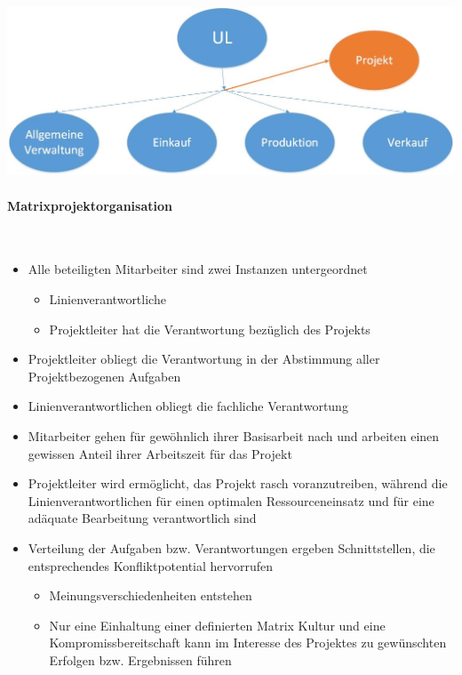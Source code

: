\includegraphics[scale=0.3]{1jahr_pictures/lf02-pic/lf02-projektkoordination.jpg}

\paragraph{Matrixprojektorganisation}~\\
\begin{itemize}
	\item Alle beteiligten Mitarbeiter sind zwei Instanzen untergeordnet
	\begin{itemize}
		\item Linienverantwortliche
		\item Projektleiter hat die Verantwortung bezüglich des Projekts
	\end{itemize}
	\item Projektleiter obliegt die Verantwortung in der Abstimmung aller Projektbezogenen Aufgaben
	\item Linienverantwortlichen obliegt die fachliche Verantwortung
	\item Mitarbeiter gehen für gewöhnlich ihrer Basisarbeit nach und arbeiten einen gewissen Anteil ihrer Arbeitszeit für das Projekt
	\item Projektleiter wird ermöglicht, das Projekt rasch voranzutreiben, während die Linienverantwortlichen für einen optimalen Ressourceneinsatz und für eine adäquate Bearbeitung verantwortlich sind
	\item Verteilung der Aufgaben bzw. Verantwortungen ergeben Schnittstellen, die entsprechendes Konfliktpotential hervorrufen
	\begin{itemize}
		\item Meinungsverschiedenheiten entstehen
		\item Nur eine Einhaltung einer definierten Matrix Kultur und eine Kompromissbereitschaft kann im Interesse des Projektes zu gewünschten Erfolgen bzw. Ergebnissen führen
	\end{itemize}
\end{itemize}

